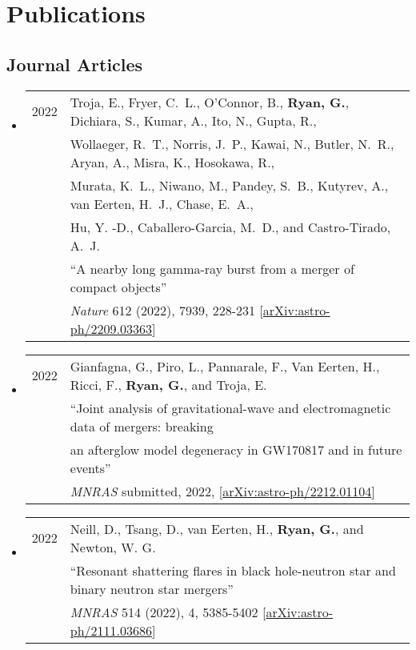 \section*{Publications}
\subsection*{Journal Articles}
\begin{itemize}

\item \begin{tabular}{ll}
2022 & {Troja}, E., {Fryer}, C.~L., {O'Connor}, B., {\bf {Ryan}, G.}, {Dichiara}, S., {Kumar}, A., {Ito}, N., {Gupta}, R.,\\
	&  {Wollaeger}, R.~T., {Norris}, J.~P., {Kawai}, N., {Butler}, N.~R., {Aryan}, A., {Misra}, K., {Hosokawa}, R., \\
	& {Murata}, K.~L., {Niwano}, M., {Pandey}, S.~B., {Kutyrev}, A., {van Eerten}, H.~J., {Chase}, E.~A., \\
	& {Hu}, Y. -D., {Caballero-Garcia}, M.~D., and {Castro-Tirado}, A.~J.  \\
	&``A nearby long gamma-ray burst from a merger of compact objects'' \\
	& \emph{Nature} 612 (2022), 7939, 228-231 [\href{https://arxiv.org/abs/2209.03363}{arXiv:astro-ph/2209.03363}]\\
\end{tabular}

\item \begin{tabular}{ll}
2022 & {Gianfagna}, G., {Piro}, L., {Pannarale}, F., {Van Eerten}, H., {Ricci}, F., {\bf {Ryan}, G.}, and {Troja}, E.\\
	&``Joint analysis of gravitational-wave and electromagnetic data of mergers: breaking \\
	& an afterglow model degeneracy in GW170817 and in future events'' \\
	& \emph{MNRAS} submitted, 2022, [\href{https://arxiv.org/abs/2212.01104}{arXiv:astro-ph/2212.01104}]\\
\end{tabular}

\item \begin{tabular}{ll}
2022 & {Neill}, D., {Tsang}, D., {van Eerten}, H., {\bf {Ryan}, G.}, and {Newton}, W. G.  \\
	&``Resonant shattering flares in black hole-neutron star and binary neutron star mergers'' \\
	& \emph{MNRAS} 514 (2022), 4, 5385-5402 [\href{https://arxiv.org/abs/2111.03686}{arXiv:astro-ph/2111.03686}]\\
\end{tabular}


\end{itemize}
